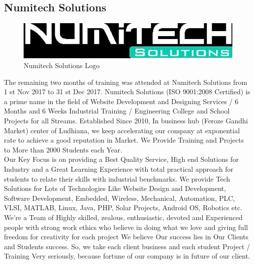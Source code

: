 \subsection{Numitech Solutions}
\begin{figure}[ht]
\centering
\includegraphics[scale=0.5]{input/images/numi.jpeg}
\caption{Numitech Solutions Logo}
\end{figure}
\noindent The remaining two months of training was attended at Numitech Solutions from 1 st Nov 2017 to 31 st Dec
2017. Numitech Solutions (ISO 9001:2008 Certified) is a prime name in the field of Website Development
and Designing Services / 6 Months and 6 Weeks Industrial Training / Engineering College and School
Projects for all Streams. Established Since 2010, In business hub (Feroze Gandhi Market) center of
Ludhiana, we keep accelerating our company at exponential rate to achieve a good reputation in Market.
We Provide Training and Projects to More than 2000 Students each Year.\\

\noindent Our Key Focus is on providing a Best Quality Service, High end Solutions for Industry and a Great Learning
Experience with total practical approach for students to relate their skills with industrial benchmarks. We
provide Tech Solutions for Lots of Technologies Like Website Design and Development, Software
Development, Embedded, Wireless, Mechanical, Automation, PLC, VLSI, MATLAB, Linux, Java, PHP,
Solar Projects, Android OS, Robotics etc.\\

\noindent We’re a Team of Highly skilled, zealous, enthusiastic, devoted and Experienced people with strong work
ethics who believe in doing what we love and giving full freedom for creativity for each project We believe
Our success lies in Our Clients and Students success. So, we take each client business and each student
Project / Training Very seriously, because fortune of our company is in future of our client.